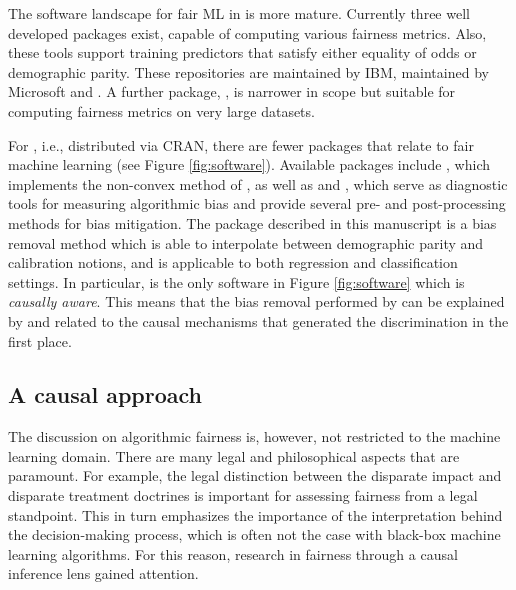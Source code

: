 \documentclass[
  nojss]{jss}
\begin{document}
The software landscape for fair ML in  is more mature.
Currently three well developed packages exist, capable of computing
various fairness metrics. Also, these tools support training predictors
that satisfy either equality of odds or demographic parity. These
repositories are  \citep{aif360-oct-2018} maintained by IBM,
 \citep{bird2020fairlearn} maintained by Microsoft and
 \citep{ethicMLrepo}. A further package,
 \citep{fairnessind}, is narrower in scope but
suitable for computing fairness metrics on very large datasets.

For , i.e., distributed via CRAN, there are fewer packages
that relate to fair machine learning (see Figure \ref{fig:software}).
Available packages include  \citep{scutari2021fairml}, which
implements the non-convex method of \cite{komiyama2018nonconvex}, as
well as  \citep{kozodoi2021fairness} and 
\citep{wisniewski2021fairmodels}, which serve as diagnostic tools for
measuring algorithmic bias and provide several pre- and post-processing
methods for bias mitigation. The  package described in
this manuscript is a bias removal method which is able to interpolate
between demographic parity and calibration notions, and is applicable to
both regression and classification settings. In particular,
 is the only software in Figure \ref{fig:software} which
is \emph{causally aware}. This means that the bias removal performed by
 can be explained by and related to the causal mechanisms
that generated the discrimination in the first place.

\hypertarget{a-causal-approach}{%
\subsection{A causal approach}\label{a-causal-approach}}

The discussion on algorithmic fairness is, however, not restricted to
the machine learning domain. There are many legal and philosophical
aspects that are paramount. For example, the legal distinction between
the disparate impact and disparate treatment doctrines
\citep{mcginley2011ricci, barocas2016big} is important for assessing
fairness from a legal standpoint. This in turn emphasizes the importance
of the interpretation behind the decision-making process, which is often
not the case with black-box machine learning algorithms. For this
reason, research in fairness through a causal inference lens gained
attention.
\end{document}

